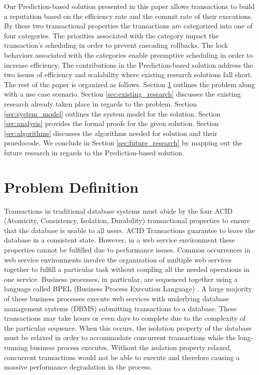 \documentclass[conference]{IEEEtran}
\begin{document}
Our Prediction-based solution presented in this paper allows transactions to build a reputation based on the efficiency rate and the commit rate of their executions. By these two transactional properties the transactions are categorized into one of four categories. The priorities associated with the category impact the transaction's scheduling in order to prevent cascading rollbacks. The lock behaviors associated with the categories enable preemptive scheduling in order to increase efficiency. The contributions in the Prediction-based solution address the two issues of efficiency and scalability where existing research solutions fall short. The rest of the paper is organized as follows. Section \ref{sec:problem_def} outlines the problem along with a use case scenario. Section \ref{sec:existing_research} discusses the existing research already taken place in regards to the problem. Section \ref{sec:system_model} outlines the system model for the solution. Section \ref{sec:analysis} provides the formal proofs for the given solution. Section \ref{sec:algorithms} discusses the algorithms needed for solution and their psuedocode. We conclude in Section \ref{sec:future_research} by mapping out the future research in regards to the Prediction-based solution.

\section{Problem Definition}
\label{sec:problem_def}
Transactions in traditional database systems must abide by the four ACID (Atomicity, Consistency, Isolation, Durability) transactional properties to ensure that the database is usable to all users. ACID Transactions guarantee to leave the database in a consistent state. However, in a web service environment these properties cannot be fulfilled due to performance issues. Common occurrences in web service environments involve the organization of multiple web services together to fulfill a particular task without coupling all the needed operations in one service. Business processes, in particular, are sequenced together using a language called BPEL (Business Process Execution Language) \cite{BPEL}. A large majority of these business processes execute web services with underlying database management systems (DBMS) submitting transactions to a database. These transactions may take hours or even days to complete due to the complexity of the particular sequence. When this occurs, the isolation property of the database must be relaxed in order to accommodate concurrent transactions while the long-running business process executes. Without the isolation property relaxed, concurrent transactions would not be able to execute and therefore causing a massive performance degradation in the process.
\end{document}
